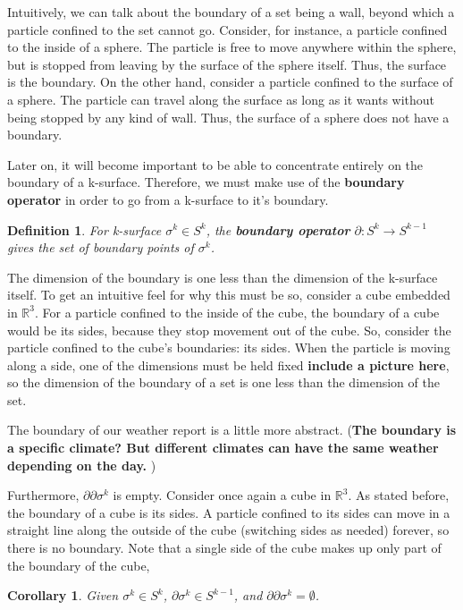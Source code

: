 \documentclass{book}
\newtheorem{defn}[equation]{Definition}
\newtheorem{coro}[equation]{Corollary}
\begin{document}
Intuitively, we can talk about the boundary of a set being a wall, beyond which a particle confined to the set cannot go. Consider, for instance, a particle confined to the inside of a sphere. The particle is free to move anywhere within the sphere, but is stopped from leaving by the surface of the sphere itself. Thus, the surface is the boundary. On the other hand, consider a particle confined to the surface of a sphere. The particle can travel along the surface as long as it wants without being stopped by any kind of wall. Thus, the surface of a sphere does not have a boundary. 

Later on, it will become important to be able to concentrate entirely on the boundary of a k-surface. Therefore, we must make use of the \textbf{boundary operator} in order to go from a k-surface to it's boundary. 

\begin{defn}
	For k-surface $\sigma^k \in S^k$, the \textbf{boundary operator} $\partial : S^k \to S^{k-1}$ gives the set of boundary points of $\sigma^k$. 
\end{defn}

The dimension of the boundary is one less than the dimension of the k-surface itself. To get an intuitive feel for why this must be so, consider a cube embedded in $\mathbb{R}^3$. For a particle confined to the inside of the cube, the boundary of a cube would be its sides, because they stop movement out of the cube. So, consider the particle confined to the cube's boundaries: its sides. When the particle is moving along a side, one of the dimensions must be held fixed \textbf{include a picture here}, so the dimension of the boundary of a set is one less than the dimension of the set. 


The boundary of our weather report is a little more abstract. (\textbf{The boundary is a specific climate? But different climates can have the same weather depending on the day. })

Furthermore, $\partial\partial \sigma^k$ is empty. Consider once again a cube in $\mathbb{R}^3$. As stated before, the boundary of a cube is its sides. A particle confined to its sides can move in a straight line along the outside of the cube (switching sides as needed) forever, so there is no boundary. Note that a single side of the cube makes up only part of the boundary of the cube, 

\begin{coro}
	Given $\sigma^k \in S^k$, $\partial \sigma^k \in S^{k-1}$, and $\partial\partial \sigma^k = \emptyset$. 
\end{coro}
\end{document}
